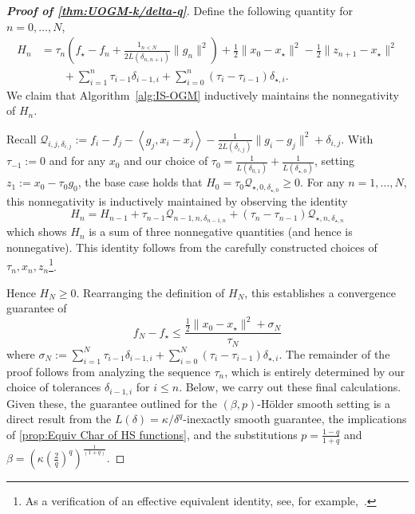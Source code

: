 \documentclass[11pt, hidelinks]{article}
\numberwithin{equation}{section}
\theoremstyle{thmstyletwo}%
\numberwithin{equation}{section}
\newcommand{\Holder}{H\"older }
\newcommand{\inner}[2]{\left\langle {#1}, {#2} \right\rangle}
\begin{document}
\begin{proof}[\bf Proof of \cref{thm:UOGM-k/delta-q}]
    Define the following quantity for $n=0,\dots,N$,
    \begin{align*}H_{n} &= \tau_{n}\left(f_\star-f_{n}+\frac{1_{n < N}}{2L(\delta_{n,n+1})}\|g_{n}\|^2 \right)+\frac{1}{2}\|x_0-x_\star\|^2-\frac{1}{2}\|z_{n+1}-x_\star\|^2\\& \qquad+\sum_{i=1}^{n}\tau_{i-1} \delta_{i-1,i}+\sum_{i=0}^{n}(\tau_i-\tau_{i-1}) \delta_{\star,i}.\end{align*}
    We claim that Algorithm~\ref{alg:IS-OGM} inductively maintains the nonnegativity of $H_n$.

    Recall $\mathcal{Q}_{i,j,\delta_{i,j}} := f_i-f_j - \inner{g_j}{x_i-x_j}-\frac{1}{2L(\delta_{i,j})}\|g_i-g_j\|^2+\delta_{i,j}$. With $\tau_{-1} := 0$ and for any $x_0$ and our choice of $\tau_0 = \frac{1}{L(\delta_{0,1})}+\frac{1}{L(\delta_{\star,0})}$, setting $z_1 := x_0-\tau_0g_0$, the base case holds that $H_0 = \tau_0 \mathcal{Q}_{\star,0,\delta_{\star,0}} \geq 0$. For any $n=1,\dots,N$, this nonnegativity is inductively maintained by observing the identity
    $$H_n =H_{n-1}+\tau_{n-1}\mathcal{Q}_{n-1,n,\delta_{n-1,n}}+(\tau_n-\tau_{n-1})\mathcal{Q}_{\star,n,\delta_{\star,n}} $$
    which shows $H_n$ is a sum of three nonnegative quantities (and hence is nonnegative). This identity follows from the carefully constructed choices of $\tau_n, x_n, z_n$\footnote{As a verification of an effective equivalent identity, see, for example,~\cite[Lemma 3]{grimmer2026minimaxoptimalitysubgameperfect}.}.

    Hence $H_N\geq 0$. Rearranging the definition of $H_N$, this establishes a convergence guarantee of
    \begin{equation}\label{general_UOGM_rate}
        f_N-f_\star \leq \frac{\frac{1}{2}\|x_0-x_\star\|^2 +\sigma_N}{\tau_N}
    \end{equation}
    where $\sigma_N := \sum_{i=1}^N \tau_{i-1}\delta_{i-1,i} +\sum_{i=0}^N (\tau_i-\tau_{i-1})\delta_{\star,i}$. The remainder of the proof follows from analyzing the sequence $\tau_n$, which is entirely determined by our choice of tolerances $\delta_{i-1,i}$ for $i \leq n$. Below, we carry out these final calculations. Given these, the guarantee outlined for the $(\beta,p)$-\Holder smooth setting is a direct result from the $L(\delta)=\kappa/\delta^q$-inexactly smooth guarantee, the implications of \cref{prop:Equiv Char of HS functions}, and the substitutions $p = \frac{1-q}{1+q}$ and $\beta = \left(\kappa\left(\frac{2}{q}\right)^{q}\right)^{\frac{1}{\left(1+q\right)}}$.
      

\end{proof}
\end{document}

